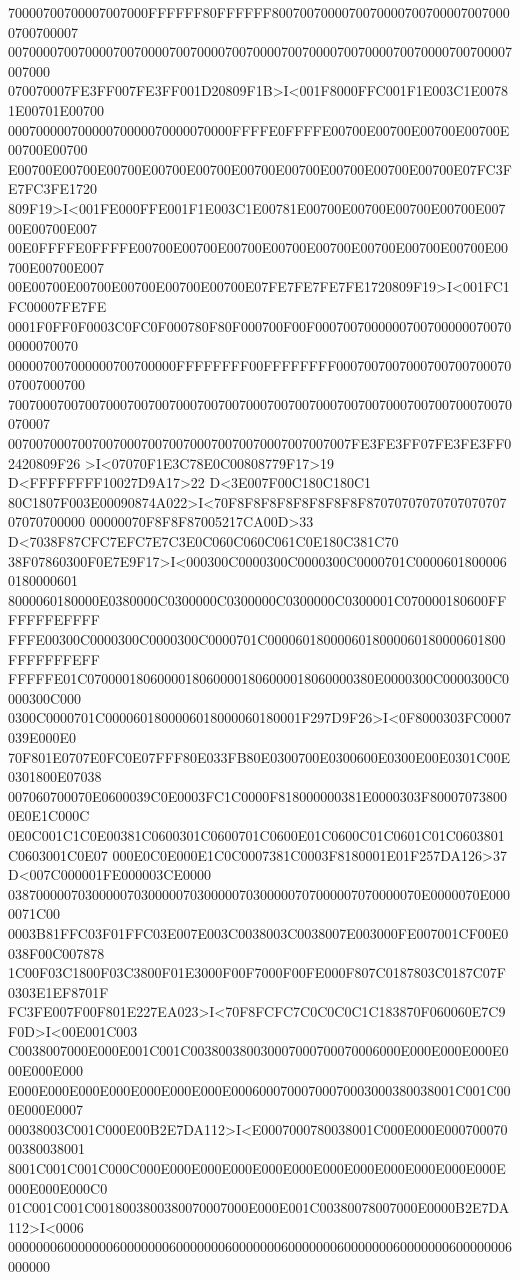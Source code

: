 70000700700007007000FFFFFF80FFFFFF80070070000700700007007000070070000700700007
007000070070000700700007007000070070000700700007007000070070000700700007007000
070070007FE3FF007FE3FF001D20809F1B>I<001F8000FFC001F1E003C1E00781E00701E00700
00070000070000070000070000070000FFFFE0FFFFE00700E00700E00700E00700E00700E00700
E00700E00700E00700E00700E00700E00700E00700E00700E00700E00700E07FC3FE7FC3FE1720
809F19>I<001FE000FFE001F1E003C1E00781E00700E00700E00700E00700E00700E00700E007
00E0FFFFE0FFFFE00700E00700E00700E00700E00700E00700E00700E00700E00700E00700E007
00E00700E00700E00700E00700E00700E07FE7FE7FE7FE1720809F19>I<001FC1FC00007FE7FE
0001F0FF0F0003C0FC0F000780F80F000700F00F00070070000007007000000700700000070070
000007007000000700700000FFFFFFFF00FFFFFFFF000700700700070070070007007007000700
700700070070070007007007000700700700070070070007007007000700700700070070070007
0070070007007007000700700700070070070007007007007FE3FE3FF07FE3FE3FF02420809F26
>I<07070F1E3C78E0C00808779F17>19 D<FFFFFFFF10027D9A17>22 D<3E007F00C180C180C1
80C1807F003E00090874A022>I<70F8F8F8F8F8F8F8F8F8707070707070707070707070700000
00000070F8F8F87005217CA00D>33 D<7038F87CFC7EFC7E7C3E0C060C060C061C0E180C381C70
38F07860300F0E7E9F17>I<000300C0000300C0000300C0000701C00006018000060180000601
8000060180000E0380000C0300000C0300000C0300000C0300001C070000180600FFFFFFFEFFFF
FFFE00300C0000300C0000300C0000701C0000601800006018000060180000601800FFFFFFFEFF
FFFFFE01C07000018060000180600001806000018060000380E0000300C0000300C0000300C000
0300C0000701C0000601800006018000060180001F297D9F26>I<0F8000303FC0007039E000E0
70F801E0707E0FC0E07FFF80E033FB80E0300700E0300600E0300E00E0301C00E0301800E07038
007060700070E0600039C0E0003FC1C0000F818000000381E0000303F800070738000E0E1C000C
0E0C001C1C0E00381C0600301C0600701C0600E01C0600C01C0601C01C0603801C0603001C0E07
000E0C0E000E1C0C0007381C0003F8180001E01F257DA126>37 D<007C000001FE000003CE0000
03870000070300000703000007030000070300000707000007070000070E0000070E0000071C00
0003B81FFC03F01FFC03E007E003C0038003C0038007E003000FE007001CF00E0038F00C007878
1C00F03C1800F03C3800F01E3000F00F7000F00FE000F807C0187803C0187C07F0303E1EF8701F
FC3FE007F00F801E227EA023>I<70F8FCFC7C0C0C0C1C183870F060060E7C9F0D>I<00E001C003
C0038007000E000E001C001C003800380030007000700070006000E000E000E000E000E000E000
E000E000E000E000E000E000E000E00060007000700070003000380038001C001C000E000E0007
00038003C001C000E00B2E7DA112>I<E0007000780038001C000E000E00070007000380038001
8001C001C001C000C000E000E000E000E000E000E000E000E000E000E000E000E000E000E000C0
01C001C001C0018003800380070007000E000E001C00380078007000E0000B2E7DA112>I<0006
000000060000000600000006000000060000000600000006000000060000000600000006000000
